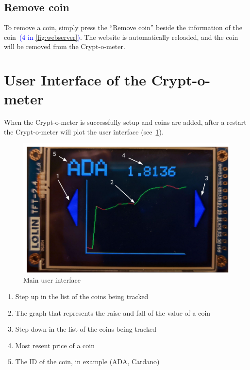 \documentclass[11pt]{article}
\begin{document}
    \subsection{Remove coin}\label{subsec:remove-coin}
    To remove a coin, simply press the ``Remove coin'' beside the information of the coin~\textcolor{blue}{(4 in \cref{fig:webserver})}.
    The website is automatically reloaded, and the coin will be removed from the Crypt-o-meter.

    \newpage

    \section{User Interface of the Crypt-o-meter}\label{sec:user-interface-crypt-o-meter}
    When the Crypt-o-meter is successfully setup and coins are added, after a restart the Crypt-o-meter will plot the user interface (see~\textcolor{blue}{\cref{fig:main_UI}}).

    \begin{figure}[H]
        \centering
        \includegraphics[width=\textwidth]{screen_1}
        \caption{Main user interface}
        \label{fig:main_UI}
    \end{figure}

    \begin{enumerate}
        \item Step up in the list of the coins being tracked
        \item The graph that represents the raise and fall of the value of a coin
        \item Step down in the list of the coins being tracked
        \item Most resent price of a coin
        \item The ID of the coin, in example (ADA, Cardano)
    \end{enumerate}
\end{document}
